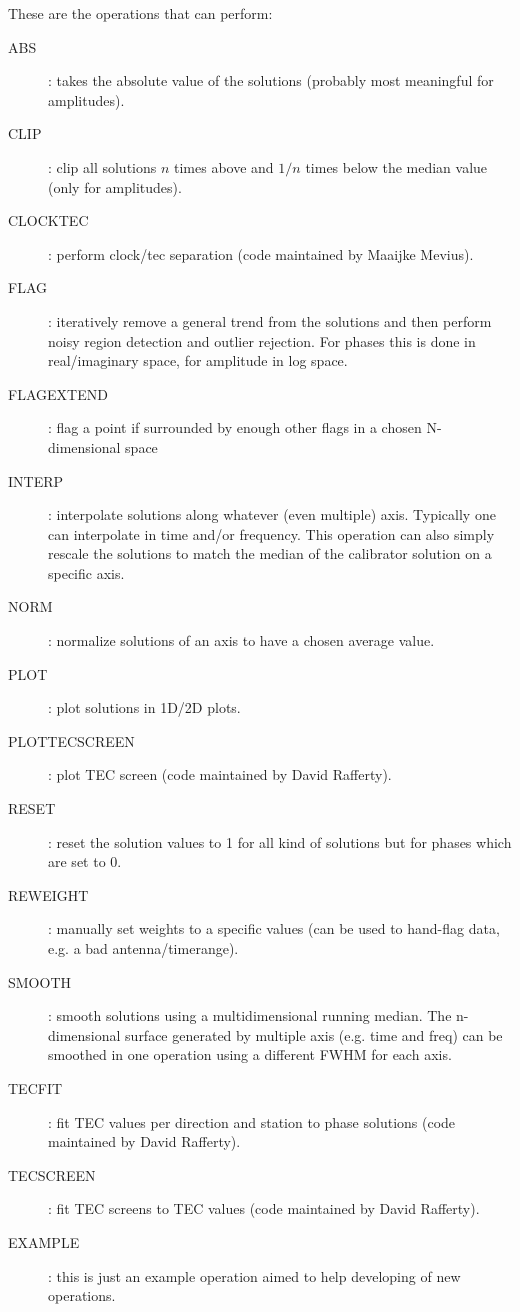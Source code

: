 \documentclass[]{article}
\begin{document}
These are the operations that \losoto{} can perform:
\begin{description}
 \item[ABS]: takes the absolute value of the solutions (probably most meaningful for amplitudes).
 \item[CLIP]: clip all solutions $n$ times above and $1/n$ times below the median value (only for amplitudes).
 \item[CLOCKTEC]: perform clock/tec separation (code maintained by Maaijke Mevius).
 \item[FLAG]: iteratively remove a general trend from the solutions and then perform noisy region detection and outlier rejection. For phases this is done in real/imaginary space, for amplitude in log space.
 \item[FLAGEXTEND]: flag a point if surrounded by enough other flags in a chosen N-dimensional space
 \item[INTERP]: interpolate solutions along whatever (even multiple) axis. Typically one can interpolate in time and/or frequency. This operation can also simply rescale the solutions to match the median of the calibrator solution on a specific axis.
 \item[NORM]: normalize solutions of an axis to have a chosen average value.
 \item[PLOT]: plot solutions in 1D/2D plots.
 \item[PLOTTECSCREEN]: plot TEC screen (code maintained by David Rafferty).
 \item[RESET]: reset the solution values to 1 for all kind of solutions but for phases which are set to 0.
 \item[REWEIGHT]: manually set weights to a specific values (can be used to hand-flag data, e.g. a bad antenna/timerange).
 \item[SMOOTH]: smooth solutions using a multidimensional running median. The n-dimensional surface generated by multiple axis (e.g. time and freq) can be smoothed in one operation using a different FWHM for each axis.
 \item[TECFIT]: fit TEC values per direction and station to phase solutions (code maintained by David Rafferty).
 \item[TECSCREEN]: fit TEC screens to TEC values (code maintained by David Rafferty).
 \item[EXAMPLE]: this is just an example operation aimed to help developing of new operations.
\end{description}
\end{document}
